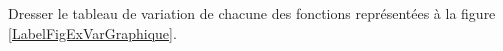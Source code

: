 
\begin{exercice}\label{exoSeconde-0072}

    Dresser le tableau de variation de chacune des fonctions représentées à la figure \ref{LabelFigExVarGraphique}.
\newcommand{\CaptionFigExVarGraphique}{Dresser le tableau de variation des fonctions.}


\end{exercice}
